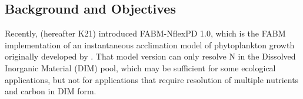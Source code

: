 \documentclass[gmd, manuscript]{copernicus}
\begin{document}
\introduction%


\subsection{Background and Objectives}
Recently, \citet{Kerimoglu2021} (hereafter K21) introduced FABM-NflexPD 1.0, which is the FABM \citep[Framework for Aquatic Biogeochemical Models][]{Bruggeman2014} implementation of an instantaneous acclimation model of phytoplankton growth originally developed by \citet{Smith2016}. That model version can only resolve N in the Dissolved Inorganic Material (DIM) pool, which may be sufficient for some ecological applications, %
but not for applications that require resolution of multiple nutrients and carbon in DIM form.
\end{document}
